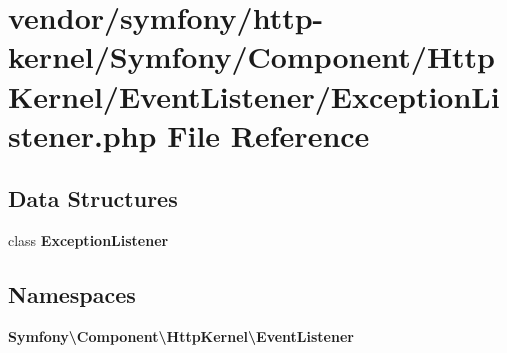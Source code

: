 \section{vendor/symfony/http-\/kernel/\+Symfony/\+Component/\+Http\+Kernel/\+Event\+Listener/\+Exception\+Listener.php File Reference}
\label{_exception_listener_8php}
\subsection*{Data Structures}
\begin{DoxyCompactItemize}
\item 
class {\bf Exception\+Listener}
\end{DoxyCompactItemize}
\subsection*{Namespaces}
\begin{DoxyCompactItemize}
\item 
 {\bf Symfony\textbackslash{}\+Component\textbackslash{}\+Http\+Kernel\textbackslash{}\+Event\+Listener}
\end{DoxyCompactItemize}

